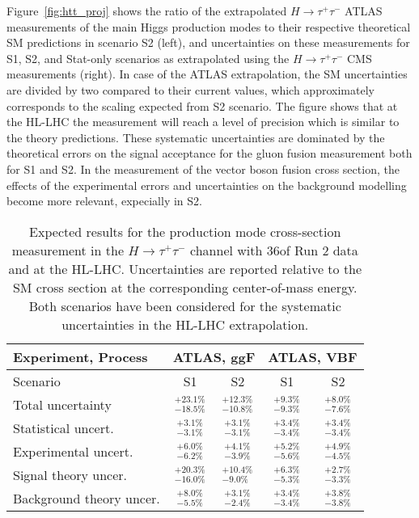 Figure~\ref{fig:htt_proj} shows the ratio of the extrapolated $H \to \tau^{+}\tau^{-}$ ATLAS measurements of the main Higgs production modes to their respective theoretical SM predictions in scenario S2 (left), and uncertainties on these measurements for S1, S2, and Stat-only scenarios as extrapolated using the $H \to \tau^{+}\tau^{-}$ CMS measurements (right).
In case of the ATLAS extrapolation, the SM uncertainties are divided by two compared to their current values, which approximately corresponds to the scaling expected from S2 scenario. The figure shows that at the HL-LHC the measurement will reach a level of precision which is  similar to the theory predictions. These systematic uncertainties are dominated by the theoretical errors on the signal acceptance for the gluon fusion measurement both for S1 and S2. In the measurement of the vector boson fusion cross section, the effects of the experimental errors and uncertainties on the background modelling become more relevant, expecially in S2. 
\begin{table}[th!]
\begin{center}
\renewcommand{\arraystretch}{1.5}
{
\caption{Expected results for the production mode cross-section measurement in the $H\to \tau^{+} \tau^{-}$ channel with 36\fbinv of Run 2 data and at the HL-LHC. Uncertainties are reported relative to the SM cross section at the corresponding center-of-mass energy. Both scenarios have been considered for the systematic uncertainties in the HL-LHC extrapolation.}
\label{tab:htt_proj}
\begin{tabular}{l | c c c c}
\hline\hline
Experiment, Process & \multicolumn{2}{c}{ATLAS, ggF}& \multicolumn{2}{c}{ATLAS, VBF}\\ 
\hline
Scenario &  S1 & S2 & S1 & S2  \\
Total uncertainty   & $^{+23.1\%}_{-18.5\%}$& $^{+12.3\%}_{-10.8\%}$  & $^{+9.3\%}_{-9.3\%}$ & $^{+8.0\%}_{-7.6\%}$ \\
\hline
Statistical uncert.  & $^{+3.1\%}_{-3.1\%}$ & $^{+3.1\%}_{-3.1\%}$  & $^{+3.4\%}_{-3.4\%}$ & $^{+3.4\%}_{-3.4\%}$\\
Experimental uncert. & $^{+6.0\%}_{-6.2\%}$ & $^{+4.1\%}_{-3.9\%}$  & $^{+5.2\%}_{-5.6\%}$ & $^{+4.9\%}_{-4.5\%}$ \\
Signal theory uncer. & $^{+20.3\%}_{-16.0\%}$ & $^{+10.4\%}_{-9.0\%}$ & $^{+6.3\%}_{-5.3\%}$ & $^{+2.7\%}_{-3.3\%}$\\
Background theory uncer. & $^{+8.0\%}_{-5.5\%}$ & $^{+3.1\%}_{-2.4\%}$ & $^{+3.4\%}_{-3.4\%}$ & $^{+3.8\%}_{-3.8\%}$\\
\hline\hline
\end{tabular}
} %
\end{center}
\end{table}

